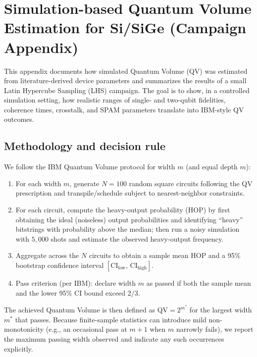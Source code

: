 \appendix
\section{Simulation-based Quantum Volume Estimation for Si/SiGe (Campaign Appendix)}\label{app:qv-campaign}

This appendix documents how simulated Quantum Volume (QV) was estimated from literature-derived device parameters and summarizes the results of a small Latin Hypercube Sampling (LHS) campaign. The goal is to show, in a controlled simulation setting, how realistic ranges of single- and two-qubit fidelities, coherence times, crosstalk, and SPAM parameters translate into IBM-style QV outcomes.

\subsection{Methodology and decision rule}
We follow the IBM Quantum Volume protocol for width $m$ (and equal depth $m$):
\begin{enumerate}
    \item For each width $m$, generate $N=100$ random square circuits following the QV prescription and transpile/schedule subject to nearest-neighbor constraints.
    \item For each circuit, compute the heavy-output probability (HOP) by first obtaining the ideal (noiseless) output probabilities and identifying ``heavy'' bitstrings with probability above the median; then run a noisy simulation with $5{,}000$ shots and estimate the observed heavy-output frequency.
    \item Aggregate across the $N$ circuits to obtain a sample mean HOP and a 95\% bootstrap confidence interval $[\mathrm{CI}_\mathrm{low},\,\mathrm{CI}_\mathrm{high}]$.
    \item Pass criterion (per IBM): declare width $m$ as passed if both the sample mean and the lower 95\% CI bound exceed $2/3$.
\end{enumerate}
The achieved Quantum Volume is then defined as $\mathrm{QV} = 2^{m^*}$ for the largest width $m^*$ that passes. Because finite-sample statistics can introduce mild non-monotonicity (e.g., an occasional pass at $m{+}1$ when $m$ narrowly fails), we report the maximum passing width observed and indicate any such occurrences explicitly.

